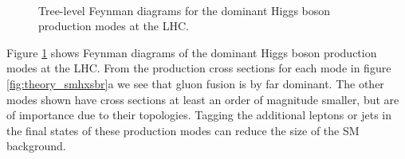 \begin{figure}[h!]
\begin{center}
~\\
\end{center}
\caption{Tree-level Feynman diagrams for the dominant Higgs boson production modes at
the \ac{LHC}.}
\label{fig:theory_smhprod}
\end{figure}

Figure \ref{fig:theory_smhprod} shows Feynman diagrams of the dominant Higgs boson production modes
at the \ac{LHC}. From the production cross sections for each mode in figure
\ref{fig:theory_smhxsbr}a we see that gluon fusion is by far dominant. The other modes
shown have cross sections at least an order of magnitude smaller, but are of importance due to their topologies.
Tagging the additional leptons or jets in the final states of
these production modes can reduce the size
of the \ac{SM} background.

